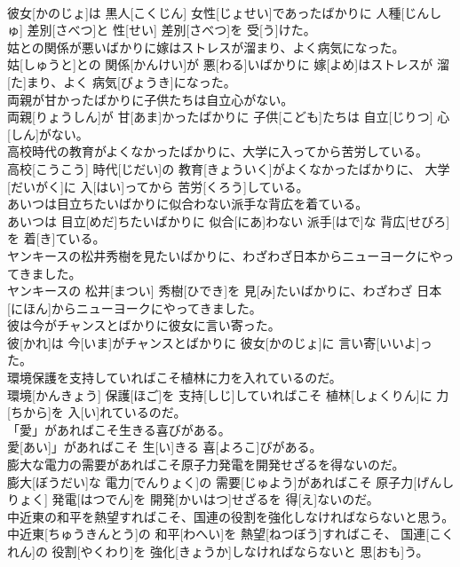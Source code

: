 \documentclass[8pt]{extreport}
\begin{document}
\begin{CJK}{UTF8}{min}
\\	彼女[かのじょ]は 黒人[こくじん] 女性[じょせい]であったばかりに 人種[じんしゅ] 差別[さべつ]と 性[せい] 差別[さべつ]を 受[う]けた。
\\	姑との関係が悪いばかりに嫁はストレスが溜まり、よく病気になった。	
\\	姑[しゅうと]との 関係[かんけい]が 悪[わる]いばかりに 嫁[よめ]はストレスが 溜[た]まり、よく 病気[びょうき]になった。
\\	両親が甘かったばかりに子供たちは自立心がない。	
\\	両親[りょうしん]が 甘[あま]かったばかりに 子供[こども]たちは 自立[じりつ] 心[しん]がない。
\\	高校時代の教育がよくなかったばかりに、大学に入ってから苦労している。	
\\	高校[こうこう] 時代[じだい]の 教育[きょういく]がよくなかったばかりに、 大学[だいがく]に 入[はい]ってから 苦労[くろう]している。
\\	あいつは目立ちたいばかりに似合わない派手な背広を着ている。	
\\	あいつは 目立[めだ]ちたいばかりに 似合[にあ]わない 派手[はで]な 背広[せびろ]を 着[き]ている。
\\	ヤンキースの松井秀樹を見たいばかりに、わざわざ日本からニューヨークにやってきました。	
\\	ヤンキースの 松井[まつい] 秀樹[ひでき]を 見[み]たいばかりに、わざわざ 日本[にほん]からニューヨークにやってきました。
\\	彼は今がチャンスとばかりに彼女に言い寄った。	
\\	彼[かれ]は 今[いま]がチャンスとばかりに 彼女[かのじょ]に 言い寄[いいよ]った。
\\	環境保護を支持していればこそ植林に力を入れているのだ。	
\\	環境[かんきょう] 保護[ほご]を 支持[しじ]していればこそ 植林[しょくりん]に 力[ちから]を 入[い]れているのだ。
\\	「愛」があればこそ生きる喜びがある。	
\\	愛[あい]」があればこそ 生[い]きる 喜[よろこ]びがある。
\\	膨大な電力の需要があればこそ原子力発電を開発せざるを得ないのだ。	
\\	膨大[ぼうだい]な 電力[でんりょく]の 需要[じゅよう]があればこそ 原子力[げんしりょく] 発電[はつでん]を 開発[かいはつ]せざるを 得[え]ないのだ。
\\	中近東の和平を熱望すればこそ、国連の役割を強化しなければならないと思う。	
\\	中近東[ちゅうきんとう]の 和平[わへい]を 熱望[ねつぼう]すればこそ、 国連[こくれん]の 役割[やくわり]を 強化[きょうか]しなければならないと 思[おも]う。

\end{CJK}
\end{document}
